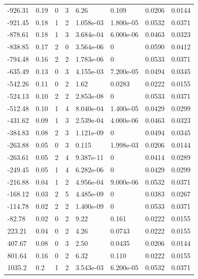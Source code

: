 \documentclass[preview]{standalone}
\begin{document}
{{\begin{tabular}{L{1.2cm}C{1.2cm} C{0.3cm}C{0.5cm} C{1.4cm}C{1.4cm} C{1.4cm}C{1.4cm}}
  -926.31  &  0.19  & 0     &  3 &  6.26  & 0.109  & 0.0206 &  0.0144   \\ 
  -921.45  &  0.18  & 1     &  2 &  1.058e-03  & 1.800e-05  & 0.0532 &  0.0371   \\ 
  -878.61  &  0.18  & 1     &  3 &  3.684e-04  & 6.000e-06  & 0.0463 &  0.0323   \\ 
  -838.85  &  0.17  & 2     &  0 &  3.564e-06  & 0  & 0.0590 &  0.0412   \\ 
  -794.48  &  0.16  & 2     &  2 &  1.783e-06  & 0  & 0.0533 &  0.0371   \\ 
  -635.49  &  0.13  & 0     &  3 &  4.155e-03  & 7.200e-05  & 0.0494 &  0.0345   \\ 
  -542.26  &  0.11  & 0     &  2 &  1.62  & 0.0283  & 0.0222 &  0.0155   \\ 
  -524.13  &  0.10  & 2     &  2 &  2.853e-08  & 0  & 0.0533 &  0.0371   \\ 
  -512.48  &  0.10  & 1     &  4 &  8.040e-04  & 1.400e-05  & 0.0429 &  0.0299   \\ 
  -431.62  &  0.09  & 1     &  3 &  2.539e-04  & 4.000e-06  & 0.0463 &  0.0323   \\ 
  -384.83  &  0.08  & 2     &  3 &  1.121e-09  & 0  & 0.0494 &  0.0345   \\ 
  -263.88  &  0.05  & 0     &  3 &  0.115  & 1.998e-03  & 0.0206 &  0.0144   \\ 
  -263.61  &  0.05  & 2     &  4 &  9.387e-11  & 0  & 0.0414 &  0.0289   \\ 
  -249.45  &  0.05  & 1     &  4 &  6.282e-06  & 0  & 0.0429 &  0.0299   \\ 
  -216.88  &  0.04  & 1     &  2 &  4.956e-04  & 9.000e-06  & 0.0532 &  0.0371   \\ 
  -168.12  &  0.03  & 2     &  5 &  4.485e-09  & 0  & 0.0383 &  0.0267   \\ 
  -114.78  &  0.02  & 2     &  2 &  1.400e-09  & 0  & 0.0533 &  0.0371   \\ 
  -82.78  &  0.02  & 0     &  2 &  9.22  & 0.161  & 0.0222 &  0.0155   \\ 
  223.21  &  0.04  & 0     &  2 &  4.26  & 0.0743  & 0.0222 &  0.0155   \\ 
  407.67  &  0.08  & 0     &  3 &  2.50  & 0.0435  & 0.0206 &  0.0144   \\ 
  801.64  &  0.16  & 0     &  2 &  6.32  & 0.110  & 0.0222 &  0.0155   \\ 
  1035.2  &   0.2  & 1     &  2 &  3.543e-03  & 6.200e-05  & 0.0532 &  0.0371   \\ 

\end{tabular}}}
\end{document}
